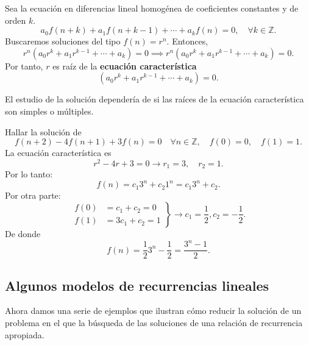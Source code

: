 \begin{definition}
Sea la ecuación en diferencias lineal homogénea de coeficientes constantes y de orden $k$. \[ a_{0}f(n+k)+a_{1}f(n+k-1)+\cdots+a_{k}f(n)=0,\quad\forall k\in\mathds{Z}. \] Buscaremos soluciones del tipo $f(n)=r^{n}.$ Entonces, \[ r^{n}\left(a_{0}r^{k}+a_{1}r^{k-1}+\cdots+a_{k}\right)=0\implies r^{n}(a_{0}r^{k}+a_{1}r^{k-1}+\cdots+a_{k})=0. \] Por tanto, $r$ es raíz de la \textbf{ecuación característica} \[ (a_{0}r^{k}+a_{1}r^{k-1}+\cdots+a_{k})=0. \]
\end{definition}

El estudio de la solución dependería de si las raíces de la ecuación característica son simples o múltiples.
\begin{example}{}
	Hallar la solución de \[ f(n+2)-4f(n+1)+3f(n)=0\quad\forall n\in\mathds{Z},\quad f(0)=0,\quad f(1)=1. \] La ecuación característica es \[ r^{2}-4r+3=0\rightarrow r_{1}=3,\quad r_{2}=1. \] Por lo tanto: \[ f(n)=c_{1}3^{n}+c_{2}1^{n}=c_{1}3^{n}+c_{2}. \] Por otra parte:
	\begin{equation*}
	\left.\begin{aligned}
	f(0)&=c_{1}+c_{2}=0\\
	f(1)&=3c_{1}+c_{2}=1
	\end{aligned}
	\right\}
	\longrightarrow c_{1}=\frac{1}{2},c_{2}=-\frac{1}{2}.
	\end{equation*}
De donde \[ f(n)=\frac{1}{2}3^{n}-\frac{1}{2}=\frac{3^{n}-1}{2}. \]
\end{example}

\subsection{Algunos modelos de recurrencias lineales}

Ahora damos una serie de ejemplos que ilustran cómo reducir la solución de un problema en el que la búsqueda de las soluciones de una relación de recurrencia apropiada.

